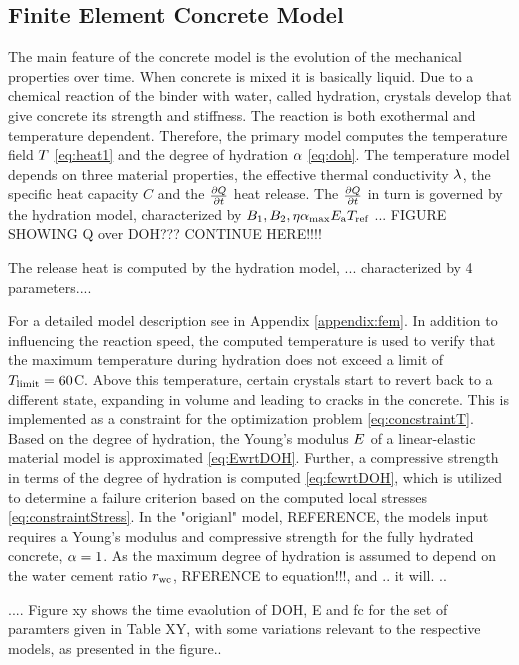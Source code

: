\subsection{Finite Element Concrete Model}
The main feature of the concrete model is the evolution of the mechanical properties over time.
When concrete is mixed it is basically liquid.
Due to a  chemical reaction of the binder with water, called hydration, crystals develop that give concrete its strength and stiffness.
The reaction is both exothermal and temperature dependent.
Therefore, the primary model computes the temperature field $T$ \eqref{eq:heat1} and the degree of hydration $\alpha$ \eqref{eq:doh}.
The temperature model depends on three material properties, the effective thermal conductivity $\lambda$, the specific heat capacity $C$ and the $\frac{\partial Q}{\partial t}$ heat release.
The $\frac{\partial Q}{\partial t}$ in turn is governed by the hydration model, characterized by 
$B_1,B_2,\eta  \alpha_{\text{max}} E_{\text{a}} T_{\text{ref}}$
...
FIGURE SHOWING Q over DOH???
CONTINUE HERE!!!!

The release heat is computed by the hydration model, ... characterized by 4 parameters....

For a detailed model description see in Appendix \ref{appendix:fem}.
In addition to influencing the reaction speed, the computed temperature is used to verify that the maximum temperature during hydration does not exceed a limit of $T_{\text{limit}} = 60$\textdegree C.
Above this temperature, certain crystals start to revert back to a different state, expanding in volume and leading to cracks in the concrete.
This is implemented as a constraint for the optimization problem \eqref{eq:concstraintT}.
Based on the degree of hydration, the Young's modulus $E$ of a linear-elastic material model
is approximated \eqref{eq:EwrtDOH}.
Further, a compressive strength in terms of the degree of hydration is computed \eqref{eq:fcwrtDOH}, which is utilized to determine a failure criterion based on the computed local stresses \eqref{eq:constraintStress}.
In the "origianl" model, REFERENCE, the models input requires a Young's modulus and compressive strength for the fully hydrated concrete, $\alpha = 1$.
As the maximum degree of hydration is assumed to depend on the water cement ratio $r_{\text{wc}}$, RFERENCE to equation!!!, and .. it will.
..  


....
Figure xy shows the time evaolution of DOH, E and fc for the set of paramters given in Table XY, with some variations relevant to the respective models, as presented in the figure..



